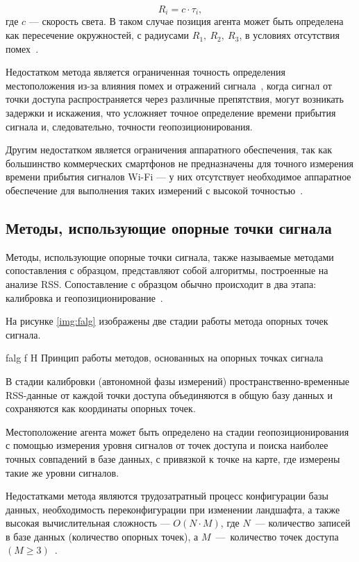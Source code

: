 \begin{equation}
    R_i = c \cdot \tau_i,
    \label{eq:toa-t}
\end{equation}
где $c$ --- скорость света. В таком случае позиция агента может быть определена как пересечение окружностей, с радиусами $R_1,~R_2,~R_3$, в условиях отсутствия помех~\cite{toa}.

Недостатком метода является ограниченная точность определения местоположения из-за влияния помех и отражений сигнала~\cite{toa}, когда сигнал от точки доступа распространяется через различные препятствия, могут возникать задержки и искажения, что усложняет точное определение времени прибытия сигнала и, следовательно, точности геопозиционирования.

Другим недостатком является ограничения аппаратного обеспечения, так как большинство коммерческих смартфонов не предназначены для точного измерения времени прибытия сигналов Wi-Fi --- у них отсутствует необходимое аппаратное обеспечение для выполнения таких измерений с высокой точностью~\cite{urban-info}.

\subsection{Методы, использующие опорные точки сигнала}

Методы, использующие опорные точки сигнала, также называемые методами сопоставления с образцом, представляют собой алгоритмы, построенные на анализе RSS. Сопоставление с образцом обычно происходит в два этапа: калибровка и геопозиционирование~\cite{intro}.

На рисунке \ref{img:falg} изображены две стадии работы метода опорных точек сигнала.

    {falg}
    {f}
    {H}
    {\linewidth}
    {Принцип работы методов, основанных на опорных точках сигнала}

В стадии калибровки (автономной фазы измерений) пространственно-временные RSS-данные от каждой точки доступа объединяются в общую базу данных и сохраняются как координаты опорных точек.

Местоположение агента может быть определено на стадии геопозиционирования с помощью измерения уровня сигналов от точек доступа и поиска наиболее точных совпадений в базе данных, с привязкой к точке на карте, где измерены такие же уровни сигналов.

Недостатками метода являются трудозатратный процесс конфигурации базы данных, необходимость переконфигурации при изменении ландшафта, а также высокая вычислительная сложность --- $O(N\cdot M)$, где $N$~--- количество записей в базе данных (количество опорных точек), а $M$~---~количество точек доступа $(M \geq 3)$~\cite{fingerprint}.

